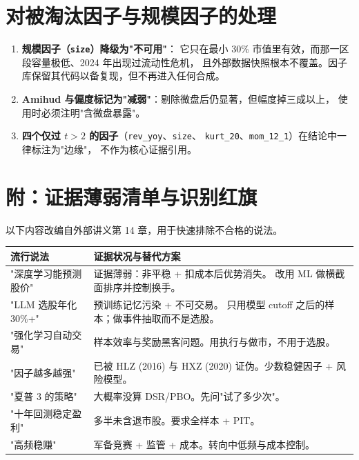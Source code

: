 \section{对被淘汰因子与规模因子的处理}

\begin{enumerate}
  \item \textbf{规模因子（\texttt{size}）降级为"不可用"}：
        它只在最小 30\% 市值里有效，而那一区段容量极低、2024 年出现过流动性危机，
        且外部数据快照根本不覆盖。因子库保留其代码以备复现，但不再进入任何合成。
  \item \textbf{Amihud 与偏度标记为"减弱"}：剔除微盘后仍显著，但幅度掉三成以上，
        使用时必须注明"含微盘暴露"。
  \item \textbf{四个仅过 $t>2$ 的因子}（\texttt{rev\_yoy}、\texttt{size}、
        \texttt{kurt\_20}、\texttt{mom\_12\_1}）在结论中一律标注为"边缘"，
        不作为核心证据引用。
\end{enumerate}

\section{附：证据薄弱清单与识别红旗}

以下内容改编自外部讲义第 14 章，用于快速排除不合格的说法。

\begin{center}
\small
\begin{tabular}{@{}p{}p{}@{}}
\toprule
流行说法 & 证据状况与替代方案 \\
\midrule
"深度学习能预测股价" & 证据薄弱：非平稳 + 扣成本后优势消失。
改用 ML 做横截面排序并控制换手。 \\
"LLM 选股年化 30\%+" & 预训练记忆污染 + 不可交易。
只用模型 cutoff 之后的样本；做事件抽取而不是选股。 \\
"强化学习自动交易" & 样本效率与奖励黑客问题。用执行与做市，不用于选股。 \\
"因子越多越强" & 已被 HLZ (2016) 与 HXZ (2020) 证伪。少数稳健因子 + 风险模型。 \\
"夏普 3 的策略" & 大概率没算 DSR/PBO。先问"试了多少次"。 \\
"十年回测稳定盈利" & 多半未含退市股。要求全样本 + PIT。 \\
"高频稳赚" & 军备竞赛 + 监管 + 成本。转向中低频与成本控制。 \\
\bottomrule
\end{tabular}
\end{center}

